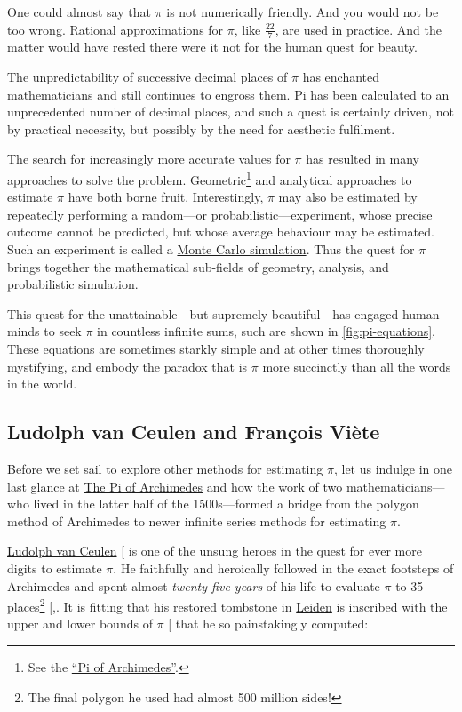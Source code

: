 \documentclass[
  a4paper,
]{article}
\begin{document}
One could almost say that \(\pi\) is not numerically friendly. And you
would not be too wrong. Rational approximations for \(\pi\), like
\(\frac{22}{7}\), are used in practice. And the matter would have rested
there were it not for the human quest for beauty.

The unpredictability of successive decimal places of \(\pi\) has
enchanted mathematicians and still continues to engross them. Pi has
been calculated to an unprecedented number of decimal places, and such a
quest is certainly driven, not by practical necessity, but possibly by
the need for aesthetic fulfilment.

The search for increasingly more accurate values for \(\pi\) has
resulted in many approaches to solve the problem. Geometric\footnote{See
  the
  \href{https://swanlotus.netlify.app/blogs/the-pi-of-archimedes}{``Pi
  of Archimedes''}.} and analytical approaches to estimate \(\pi\) have
both borne fruit. Interestingly, \(\pi\) may also be estimated by
repeatedly performing a random---or probabilistic---experiment, whose
precise outcome cannot be predicted, but whose average behaviour may be
estimated. Such an experiment is called a
\href{https://www.ibm.com/topics/monte-carlo-simulation}{Monte Carlo
simulation}. Thus the quest for \(\pi\) brings together the mathematical
sub-fields of geometry, analysis, and probabilistic simulation.

This quest for the unattainable---but supremely beautiful---has engaged
human minds to seek \(\pi\) in countless infinite sums, such are shown
in \cref{fig:pi-equations}. These equations are sometimes starkly simple
and at other times thoroughly mystifying, and embody the paradox that is
\(\pi\) more succinctly than all the words in the world.

\subsection{Ludolph van Ceulen and François
Viète}\label{ludolph-van-ceulen-and-franuxe7ois-viuxe8te}

Before we set sail to explore other methods for estimating \(\pi\), let
us indulge in one last glance at
\href{https://swanlotus.netlify.app/blogs/the-pi-of-archimedes}{The Pi
of Archimedes} and how the work of two mathematicians---who lived in the
latter half of the 1500s---formed a bridge from the polygon method of
Archimedes to newer infinite series methods for estimating \(\pi\).

\href{https://en.wikipedia.org/wiki/Ludolph_van_Ceulen}{Ludolph van
Ceulen} {[}\citeproc{ref-van-ceulen}{10}{]} is one of the unsung heroes
in the quest for ever more digits to estimate \(\pi\). He faithfully and
heroically followed in the exact footsteps of Archimedes and spent
almost \emph{twenty-five years} of his life to evaluate \(\pi\) to 35
places\footnote{The final polygon he used had almost 500 million sides!}
{[},\citeproc{ref-van-ceulen-memorial}{11}{]}.
It is fitting that his restored tombstone in
\href{https://en.wikipedia.org/wiki/Leiden}{Leiden} is inscribed with
the upper and lower bounds of \(\pi\) {[}\citeproc{ref-tombstone}{12}{]}
that he so painstakingly computed:
\end{document}
